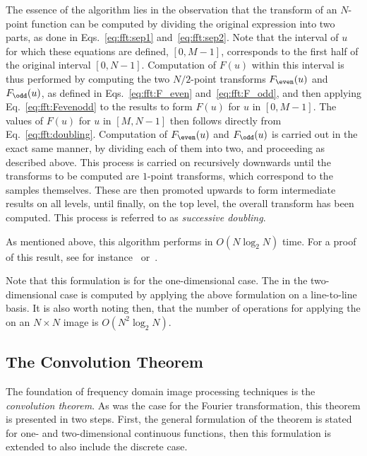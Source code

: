 The essence of the {\fft} algorithm lies in the observation that the
transform of an $N$-point function can be computed by dividing the
original expression into two parts, as done in Eqs.~\ref{eq:fft:sep1}
and~\ref{eq:fft:sep2}.  Note that the interval of $u$ for which these
equations are defined, $[0,M-1]$, corresponds to the first half of the
original interval $[0,N-1]$.  Computation of $F(u)$ within this
interval is thus performed by computing the two $N/2$-point transforms
$F_{\even}(u)$ and $F_{\odd}(u)$, as defined in
Eqs.~\ref{eq:fft:F_even} and~\ref{eq:fft:F_odd}, and then applying
Eq.~\ref{eq:fft:Fevenodd} to the results to form $F(u)$ for $u$ in
$[0,M-1]$.  The values of $F(u)$ for $u$ in $[M,N-1]$ then follows
directly from Eq.~\ref{eq:fft:doubling}.  Computation of
$F_{\even}(u)$ and $F_{\odd}(u)$ is carried out in the exact same
manner, by dividing each of them into two, and proceeding as described
above.  This process is carried on recursively downwards until the
transforms to be computed are $1$-point transforms, which correspond
to the samples themselves.  These are then promoted upwards to form
intermediate results on all levels, until finally, on the top level,
the overall transform has been computed.  This process is referred to
as {\em successive doubling\/}.

As mentioned above, this algorithm performs in $O(N\log_{2}N)$ time.
For a proof of this result, see for instance~\cite{brigham}
or~\cite{digim}.

Note that this formulation is for the one-dimensional case.  The
{\fft} in the two-dimensional case is computed by applying the above
formulation on a line-to-line basis.  It is also worth noting then,
that the number of operations for applying the {\fft} on an $N\times
N$ image is $O(N^{2}\log_{2}N)$.


\subsection{The Convolution Theorem}
\label{image:frequency:convolution}

The foundation of frequency domain image processing techniques is the
{\em convolution theorem\/}.  As was the case for the Fourier
transformation, this theorem is presented in two steps.  First, the
general formulation of the theorem is stated for one- and
two-dimensional continuous functions, then this formulation is
extended to also include the discrete case.

